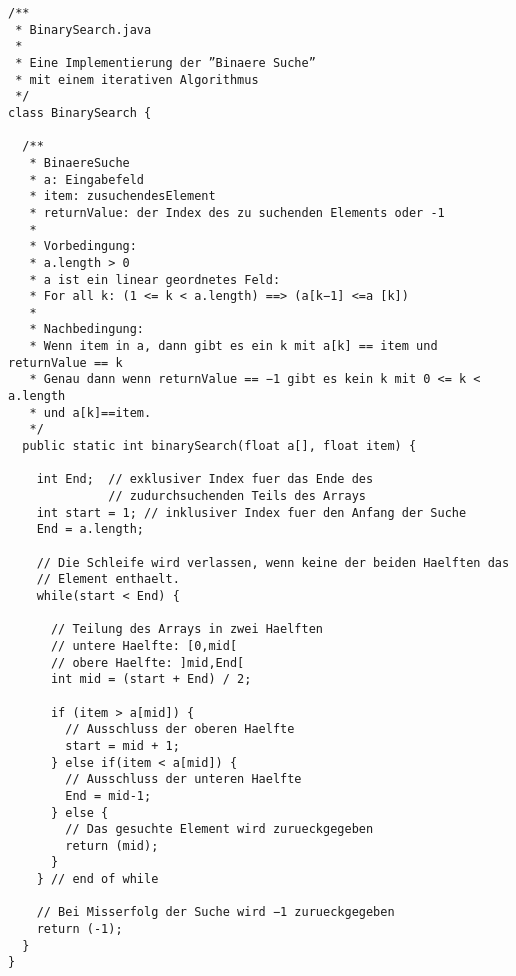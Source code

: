 \documentclass{lehramt-informatik-aufgabe}
\begin{document}
\bigskip



\begin{verbatim}
/**
 * BinarySearch.java
 *
 * Eine Implementierung der ”Binaere Suche”
 * mit einem iterativen Algorithmus
 */
class BinarySearch {

  /**
   * BinaereSuche
   * a: Eingabefeld
   * item: zusuchendesElement
   * returnValue: der Index des zu suchenden Elements oder -1
   *
   * Vorbedingung:
   * a.length > 0
   * a ist ein linear geordnetes Feld:
   * For all k: (1 <= k < a.length) ==> (a[k−1] <=a [k])
   *
   * Nachbedingung:
   * Wenn item in a, dann gibt es ein k mit a[k] == item und returnValue == k
   * Genau dann wenn returnValue == −1 gibt es kein k mit 0 <= k < a.length
   * und a[k]==item.
   */
  public static int binarySearch(float a[], float item) {

    int End;  // exklusiver Index fuer das Ende des
              // zudurchsuchenden Teils des Arrays
    int start = 1; // inklusiver Index fuer den Anfang der Suche
    End = a.length;

    // Die Schleife wird verlassen, wenn keine der beiden Haelften das
    // Element enthaelt.
    while(start < End) {

      // Teilung des Arrays in zwei Haelften
      // untere Haelfte: [0,mid[
      // obere Haelfte: ]mid,End[
      int mid = (start + End) / 2;

      if (item > a[mid]) {
        // Ausschluss der oberen Haelfte
        start = mid + 1;
      } else if(item < a[mid]) {
        // Ausschluss der unteren Haelfte
        End = mid-1;
      } else {
        // Das gesuchte Element wird zurueckgegeben
        return (mid);
      }
    } // end of while

    // Bei Misserfolg der Suche wird −1 zurueckgegeben
    return (-1);
  }
}
\end{verbatim}
\end{document}
